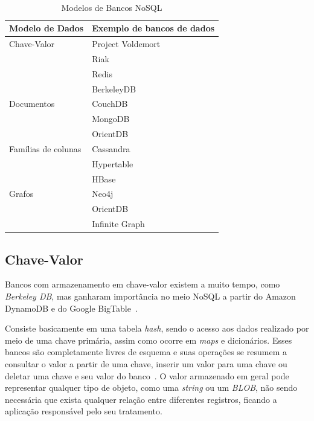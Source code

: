 ~\begin{table}[]
\centering
\caption{Modelos de Bancos NoSQL}
\label{tab:modelosnosql}
\begin{tabular}{ll}
\textbf{Modelo de Dados}     & \textbf{Exemplo de bancos de dados}      \\ \hline
Chave-Valor         & Project Voldemort               \\
                    & Riak                            \\
                    & Redis                           \\
                    & BerkeleyDB                      \\ \hline
Documentos          & CouchDB                         \\
                    & MongoDB                         \\
                    & OrientDB                        \\ \hline
Famílias de colunas & Cassandra                       \\
					& Hypertable                      \\
                    & HBase                           \\ \hline
Grafos              & Neo4j \\
                    & OrientDB                        \\
                    & Infinite Graph                 
\end{tabular}
\end{table}

\subsection*{Chave-Valor}
Bancos com armazenamento em chave-valor existem a muito tempo, como \emph{Berkeley DB}, mas ganharam importância no meio NoSQL a partir do Amazon DynamoDB e do Google BigTable~\cite{chrisnosql}.

Consiste basicamente em uma tabela \emph{hash}, sendo o acesso aos dados realizado por meio de uma chave primária, assim como ocorre em \emph{maps} e dicionários.  Esses bancos são completamente livres de esquema e suas operações se resumem a consultar o valor a partir de uma chave, inserir um valor para uma chave ou deletar uma chave e seu valor do banco~\cite{nosqleval}. O valor armazenado em geral pode representar qualquer tipo de objeto, como uma \emph{string} ou um \emph{BLOB}, não sendo necessária que exista qualquer relação entre diferentes registros, ficando a aplicação responsável pelo seu tratamento. 

